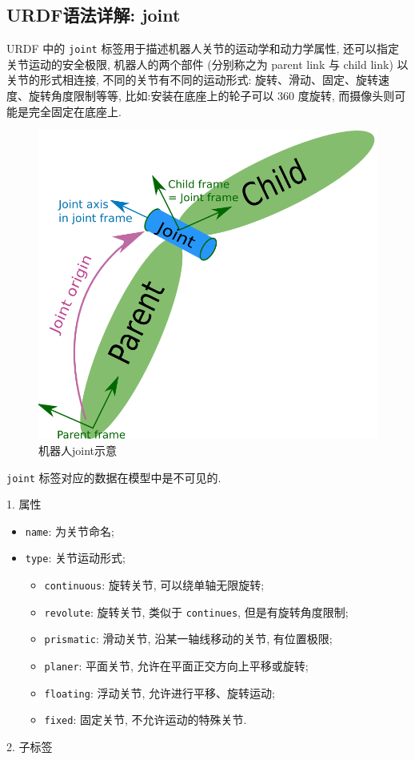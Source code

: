\documentclass[openany, fontset=windowsold]{ctexbook}
\theoremstyle{kaiti}
\theoremstyle{normal}
\begin{document}
\subsection{URDF语法详解: joint}

URDF 中的 \verb|joint| 标签用于描述机器人关节的运动学和动力学属性, 还可以指定关节运动的安全极限, 机器人的两个部件 (分别称之为 parent link 与 child link) 以关节的形式相连接, 不同的关节有不同的运动形式: 旋转、滑动、固定、旋转速度、旋转角度限制等等, 比如:安装在底座上的轮子可以 360 度旋转, 而摄像头则可能是完全固定在底座上.

\begin{figure}[!ht]
  \centering
  \includegraphics[width=.4\textwidth]{robot_joint.png}
  \caption{机器人joint示意}
  \label{fig:robot_joint}
\end{figure}

\verb|joint| 标签对应的数据在模型中是不可见的.

1. 属性

\begin{itemize}
  \item \verb|name|: 为关节命名;
  \item \verb|type|: 关节运动形式;
  \begin{itemize}
    \item \verb|continuous|: 旋转关节, 可以绕单轴无限旋转;
    \item \verb|revolute|: 旋转关节, 类似于 \verb|continues|, 但是有旋转角度限制;
    \item \verb|prismatic|: 滑动关节, 沿某一轴线移动的关节, 有位置极限;
    \item \verb|planer|: 平面关节, 允许在平面正交方向上平移或旋转;
    \item \verb|floating|: 浮动关节, 允许进行平移、旋转运动;
    \item \verb|fixed|: 固定关节, 不允许运动的特殊关节.
  \end{itemize}
\end{itemize}

2. 子标签
\end{document}
